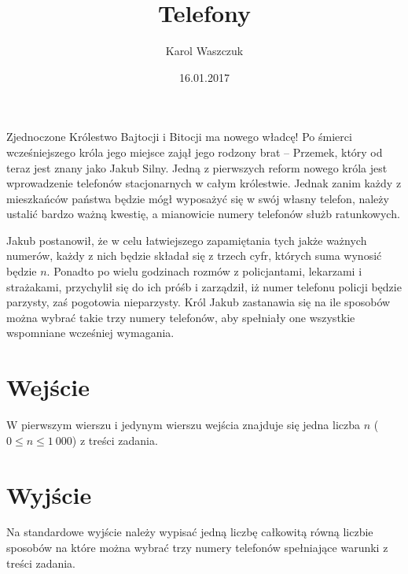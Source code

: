 \documentclass[zad,zawodnik,utf8]{sinol}
\title{Telefony}
\author{Karol Waszczuk} %
\date{16.01.2017}
\begin{document}
\begin{tasktext}%

Zjednoczone Królestwo Bajtocji i Bitocji ma nowego władcę! Po śmierci wcześniejszego króla jego miejsce zajął jego rodzony brat -- Przemek, który od teraz jest znany jako Jakub Silny. Jedną z pierwszych reform nowego króla jest wprowadzenie telefonów stacjonarnych w całym królestwie. Jednak zanim każdy z mieszkańców państwa będzie mógł wyposażyć się w swój własny telefon, należy ustalić bardzo ważną kwestię, a mianowicie numery telefonów służb ratunkowych.

Jakub postanowił, że w celu łatwiejszego zapamiętania tych jakże ważnych numerów, każdy z nich będzie składał się z trzech cyfr, których suma wynosić będzie $n$. Ponadto po wielu godzinach rozmów z policjantami, lekarzami i strażakami, przychylił się do ich próśb i zarządził, iż numer telefonu policji będzie parzysty, zaś pogotowia nieparzysty. Król Jakub zastanawia się na ile sposobów można wybrać takie trzy numery telefonów, aby spełniały one wszystkie wspomniane wcześniej wymagania.

  \section{Wejście}
W pierwszym wierszu i jedynym wierszu wejścia znajduje się jedna liczba $n$ ($0 \leq n \leq 1\ 000$) z treści zadania.

  \section{Wyjście}
Na standardowe wyjście należy wypisać jedną liczbę całkowitą równą liczbie sposobów na które można wybrać trzy numery telefonów spełniające warunki z treści zadania.

\makecompactexample
\end{tasktext}
\end{document}
